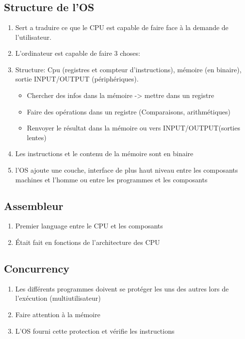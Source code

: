 \chapter{}
\section{Structure de l'OS}
\begin{enumerate}
\item Sert a traduire ce que le CPU est capable de faire face à la demande de l'utilisateur.
\item L'ordinateur est capable de faire 3 choses:
\item Structure: Cpu (registres et compteur d'instructions), mémoire (en binaire), sortie INPUT/OUTPUT (périphériques).
\begin{itemize}
  \item Chercher des infos dans la mémoire -> mettre dans un registre
  \item Faire des opérations dans un registre (Comparaisons, arithmétiques)
  \item Renvoyer le résultat dans la mémoire ou vers INPUT/OUTPUT(sorties lentes)
\end{itemize}
\item Les instructions et le contenu de la mémoire sont en binaire
\item l'OS ajoute une couche, interface de plus haut niveau entre les composants machines et l'homme ou entre les programmes et les composants
\end{enumerate}

\section{Assembleur}
\begin{enumerate}
\item Premier language entre le CPU et les composants
\item Était fait en fonctions de l'architecture des CPU
\end{enumerate}

\section{Concurrency}
\begin{enumerate}
\item Les différents programmes doivent se protéger les uns des autres lors de l'exécution (multiutilisateur)
\item Faire attention à la mémoire
\item L'OS fourni cette protection et vérifie les instructions
\end{enumerate}

